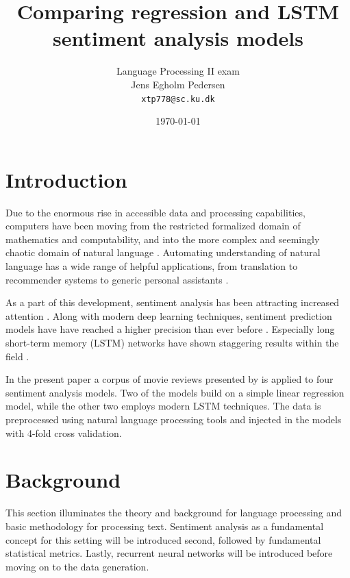 \documentclass[a4paper]{article}
\title{Comparing regression and LSTM sentiment analysis models}
\author{Language Processing II exam \\ Jens Egholm Pedersen \\ \texttt{xtp778@sc.ku.dk}}
\date{\today}
\begin{document}
\begin{titlepage}
\maketitle

\tableofcontents
\end{titlepage}

\pagebreak

\section{Introduction}
\label{sec:introduction}
Due to the enormous rise in accessible data and processing capabilities,
computers have been moving from the restricted formalized domain of
mathematics and computability, and into the more complex and seemingly
chaotic domain of natural language \citep{NILSSON2009, Jurafsky2000}. Automating
understanding of natural language has a wide range of helpful applications,
from translation to recommender systems to generic personal assistants
\citep{COX2005, BKL2009}.

As a part of this development, sentiment analysis has been attracting increased
attention \citep{BKL2009, Jurafsky2000}. Along with modern deep learning
techniques, sentiment prediction models have have reached a higher precision
than ever before \citep{Jurafsky2000, Schmidhuber2015}.
Especially long short-term memory (LSTM) networks have shown staggering results
within the field \citep{Schmidhuber2015}.

In the present paper a corpus of movie reviews presented by \cite{PangLee2005}
is applied to four sentiment analysis models.
Two of the models build on a simple linear regression model, while the other
two employs modern LSTM techniques. The data is preprocessed using natural
language processing tools and injected in the models with 4-fold cross
validation.

\section{Background}
\label{sec:background}
This section illuminates the theory and background for language processing
and basic methodology for processing text.
Sentiment analysis as a fundamental concept for this setting will be introduced
second, followed by fundamental statistical metrics. Lastly,
recurrent neural networks will be introduced before moving on to the data
generation.
\end{document}
